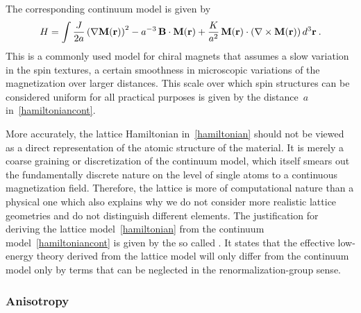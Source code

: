 The corresponding continuum model is given by~\cite{skyrm4, skyrm12}
%
\begin{equation}\label{hamiltoniancont}
  H = \int \frac{J}{2 a}\, {(\nabla \mathbf{M} (\mathbf{r}) )}^2 - a^{-3}\, \mathbf{B} \cdot \mathbf{M} (\mathbf{r}) +
  \frac{K}{a^2}\, \mathbf{M} (\mathbf{r})\cdot (\nabla \times \mathbf{M} (\mathbf{r})) \,d^3 \mathbf{r} \:.
\end{equation}
%
This is a commonly used model for chiral magnets that assumes a slow variation
in the spin textures, \ie{} a certain smoothness in microscopic variations of
the magnetization over larger distances. This scale over which spin structures
can be considered uniform for all practical purposes is given by the
distance~$a$ in~\eqref{hamiltoniancont}.

More accurately, the lattice Hamiltonian in~\eqref{hamiltonian} should not be
viewed as a direct representation of the atomic structure of the material. It is
merely a coarse graining or discretization of the continuum model, which itself
smears out the fundamentally discrete nature on the level of single atoms to a
continuous magnetization field. Therefore, the lattice is more of computational
nature than a physical one which also explains why we do not consider more
realistic lattice geometries and do not distinguish different elements. The
justification for deriving the lattice model~\eqref{hamiltonian} from the
continuum model~\eqref{hamiltoniancont} is given by the so called
. It states that the effective low-energy theory
derived from the lattice model will only differ from the continuum model only by
terms that can be neglected in the renormalization-group sense.

\subsubsection{Anisotropy}

